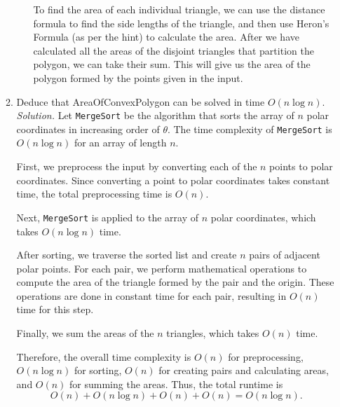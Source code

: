 \documentclass[11pt]{article}
\begin{document}
\begin{enumerate}
\begin{enumerate}
\begin{enumerate}
            To find the area of each individual triangle, we can use the distance formula to find the side lengths of the triangle, and then use Heron's Formula (as per the hint) to calculate the area. After we have calculated all the areas of the disjoint triangles that partition the polygon, we can take their sum. This will give us the area of the polygon formed by the points given in the input.
        \end{enumerate}

        \item Deduce that AreaOfConvexPolygon can be solved in time $O(n\log n)$. \\
        \textit{Solution.} Let \texttt{MergeSort} be the algorithm that sorts the array of $n$ polar coordinates in increasing order of $\theta$. The time complexity of \texttt{MergeSort} is $O(n\log n)$ for an array of length $n$.

        First, we preprocess the input by converting each of the $n$ points to polar coordinates. Since converting a point to polar coordinates takes constant time, the total preprocessing time is $O(n)$.

        Next, \texttt{MergeSort} is applied to the array of $n$ polar coordinates, which takes $O(n \log n)$ time. 

        After sorting, we traverse the sorted list and create $n$ pairs of adjacent polar points. For each pair, we perform mathematical operations to compute the area of the triangle formed by the pair and the origin. These operations are done in constant time for each pair, resulting in $O(n)$ time for this step.

        Finally, we sum the areas of the $n$ triangles, which takes $O(n)$ time.

        Therefore, the overall time complexity is $O(n)$ for preprocessing, $O(n\log n)$ for sorting, $O(n)$ for creating pairs and calculating areas, and $O(n)$ for summing the areas. Thus, the total runtime is 
        \[
        O(n) + O(n\log n) + O(n) + O(n) = O(n\log n).
        \]
        

\end{enumerate}
\end{enumerate}
\end{document}
